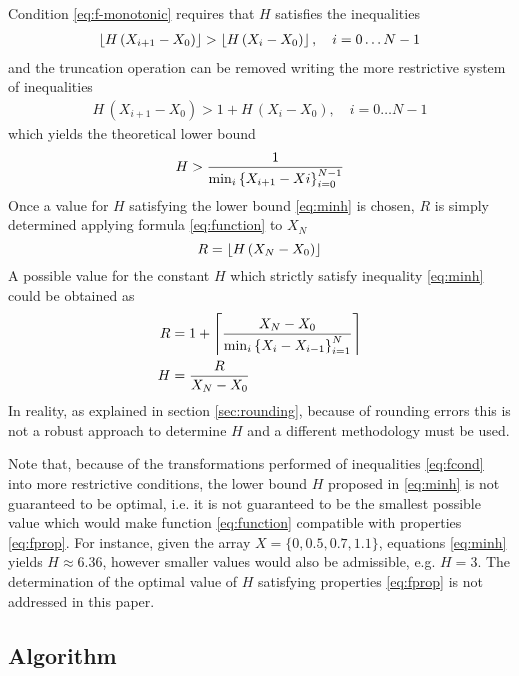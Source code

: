 \documentclass[preprint,1p,times]{elsarticle}
\begin{document}
Condition \eqref{eq:f-monotonic} requires that $H$ satisfies the inequalities
\begin{align}
\label{eq:fcond}
	\left \lfloor H\,(X_{i+1}-X_0) \right \rfloor > \left \lfloor H\,(X_i-X_0) \right \rfloor, \quad  i=0 \dots N-1
\end{align}
and the truncation operation can be removed writing the more restrictive system of inequalities
\begin{align}
\label{eq:fcond9}
	H\,(X_{i+1}-X_0) > 1+ H\,(X_i-X_0), \quad  i=0 \dots N-1
\end{align}
which yields the theoretical lower bound
\begin{equation}
\label{eq:minh}
	H > \frac{1}{\min_i\left \{ X_{i+1}-Xi \right \}_{i=0}^{N-1}}
\end{equation}
Once a value for $H$ satisfying the lower bound \eqref{eq:minh} is chosen, $R$ is simply determined applying formula \eqref{eq:function} to $X_N$
\begin{equation}
\label{eq:minr}
	R = \left \lfloor H\,(X_{N}-X_0) \right \rfloor
\end{equation}
A possible value for the constant $H$ which strictly satisfy inequality \eqref{eq:minh} could be obtained as
\begin{subequations}
\label{eq:rhtheory}
\begin{align}
\label{eq:rtheory}
	R &= 1+\left \lceil  \frac{X_N-X_0}{\min_i\left \{  X_{i}-X_{i-1}  \right \}_{i=1}^{N} }  \right \rceil \\
\label{eq:htheory}
        H &= \frac{R}{X_N-X_0}
\end{align}
\end{subequations}
In reality, as explained in section \ref{sec:rounding}, because of rounding errors this is not a robust approach to determine $H$ and a different methodology must be used.

Note that, because of the transformations performed of inequalities \eqref{eq:fcond} into more restrictive conditions, the lower bound $H$ proposed in \eqref{eq:minh} is not guaranteed to be optimal, i.e. it is not guaranteed to be the smallest possible value which would make function \eqref{eq:function} compatible with properties \eqref{eq:fprop}. For instance, given the array $X=\{0, 0.5, 0.7, 1.1\}$, equations \eqref{eq:minh} yields $H \approx 6.36$, however smaller values would also be admissible, e.g. $H=3$. The determination of the optimal value of $H$ satisfying properties \eqref{eq:fprop} is not addressed in this paper.

\subsection{Algorithm}
\label{sec:dirsearch}
\end{document}
